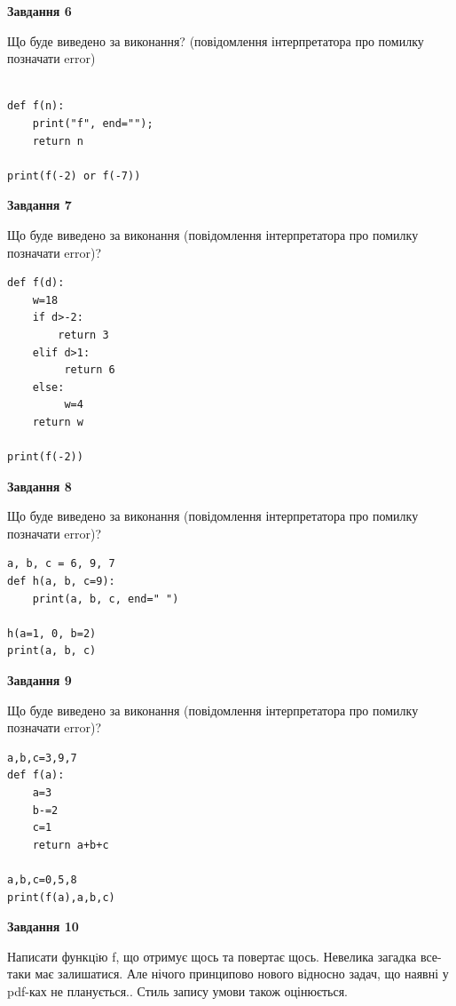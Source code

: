 \documentclass[12pt, ukrainian]{article}
\begin{document}
{\begin {large}
{\begin {center}\textbf{Завдання 6}\end {center}}

Що буде виведено за виконання? (повідомлення інтерпретатора про помилку позначати error)\par
\begin{verbatim}

def f(n):
    print("f", end="");
    return n

print(f(-2) or f(-7))
\end{verbatim}

{\begin {center}\textbf{Завдання 7}\end {center}}

Що буде виведено за виконання (повідомлення інтерпретатора про помилку позначати error)?\par
\begin{verbatim}
def f(d):
    w=18
    if d>-2: 
        return 3
    elif d>1:
         return 6
    else:
         w=4
    return w

print(f(-2))
\end{verbatim}

{\begin {center}\textbf{Завдання 8}\end {center}}

Що буде виведено за виконання (повідомлення інтерпретатора про помилку позначати error)?\par
\begin{verbatim}
a, b, c = 6, 9, 7
def h(a, b, c=9):
    print(a, b, c, end=" ")

h(a=1, 0, b=2)
print(a, b, c)
\end{verbatim}

{\begin {center}\textbf{Завдання 9}\end {center}}

Що буде виведено за виконання (повідомлення інтерпретатора про помилку позначати error)?\par
\begin{verbatim}
a,b,c=3,9,7
def f(a):
    a=3
    b-=2
    c=1
    return a+b+c

a,b,c=0,5,8
print(f(a),a,b,c)
\end{verbatim}

{\begin {center}\textbf{Завдання 10}\end {center}}


Написати функцiю f, що отримує щось та повертає щось. Невелика загадка все-таки має залишатися. Але нічого принципово нового відносно задач, що наявні у pdf-ках не планується.. Стиль запису умови також оцінюється.\par
\end {large}}
\newpage
\end{document}
